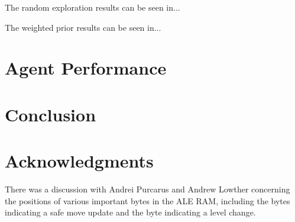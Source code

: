 \documentclass[a4paper,titlepage]{article}
\begin{document}
	The random exploration results can be seen in...
	
	
	The weighted prior results can be seen in...
	
	
	
	\section{Agent Performance}
	
	

	\section*{Conclusion}
	
	
	\section{Acknowledgments}
	
	There was a discussion with Andrei Purcarus and Andrew Lowther concerning the positions of various important bytes in the ALE RAM, including the bytes indicating a safe move update and the byte indicating a level change.
	
	
	
	
\end{document}
